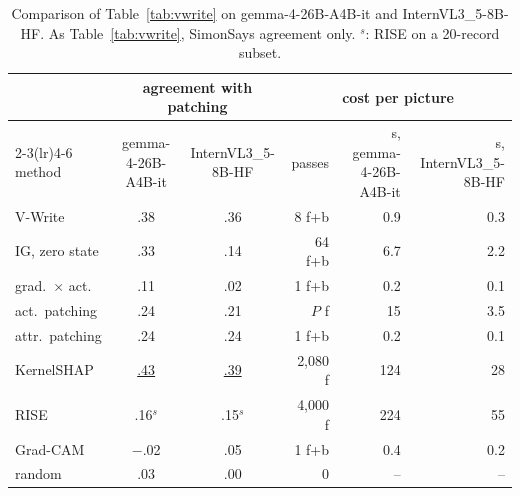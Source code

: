 \begin{table}[!htbp]
  \centering
  \small
\caption{Comparison of Table~\ref{tab:vwrite} on gemma-4-26B-A4B-it and InternVL3\_5-8B-HF. As Table~\ref{tab:vwrite}, SimonSays agreement only. $^{s}$: RISE on a 20-record subset.}
  \label{tab:vwrite_xfam}
\begin{tabular}{lccrrr}
\toprule
 & \multicolumn{2}{c}{agreement with patching} & \multicolumn{3}{c}{cost per picture} \\
\cmidrule(lr){2-3}\cmidrule(lr){4-6}
method & gemma-4-26B-A4B-it & InternVL3\_5-8B-HF & passes & s, gemma-4-26B-A4B-it & s, InternVL3\_5-8B-HF \\
\midrule
V-Write & .38 & .36 & 8 f+b & 0.9 & 0.3 \\
\midrule
IG, zero state & .33 & .14 & 64 f+b & 6.7 & 2.2 \\
grad.\ $\times$ act. & .11 & .02 & 1 f+b & 0.2 & 0.1 \\
act.\ patching & .24 & .21 & $P$ f & 15 & 3.5 \\
attr.\ patching & .24 & .24 & 1 f+b & 0.2 & 0.1 \\
KernelSHAP & \underline{.43} & \underline{.39} & 2,080 f & 124 & 28 \\
RISE & .16$^{s}$ & .15$^{s}$ & 4,000 f & 224 & 55 \\
Grad-CAM & $-$.02 & .05 & 1 f+b & 0.4 & 0.2 \\
random & .03 & .00 & 0 & -- & -- \\
\bottomrule
\end{tabular}
\end{table}
